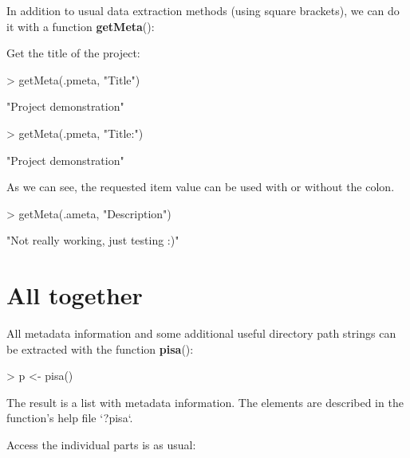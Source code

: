 \documentclass[a4paper,12pt]{article}\usepackage[]{graphicx}\usepackage[]{color}
\makeatletter
\providecommand\code{\bgroup\@codex}
\def\@codex#1{{\normalfont\ttfamily\hyphenchar\font=-1  #1}\egroup}
\providecommand{\fct}[1]{{\ttfamily\textbf{#1}()}}
\makeatother
\begin{document}
In addition to usual data extraction methods (using square brackets), we can do it with a function \fct{getMeta}:

Get the title of the project:

\begin{Schunk}
\begin{Sinput}
> getMeta(.pmeta, "Title")
\end{Sinput}
\begin{Soutput}
[1] "Project demonstration"
\end{Soutput}
\begin{Sinput}
> getMeta(.pmeta, "Title:")
\end{Sinput}
\begin{Soutput}
[1] "Project demonstration"
\end{Soutput}
\end{Schunk}

As we can see, the requested item value can be used with or without the colon.

\begin{Schunk}
\begin{Sinput}
> getMeta(.ameta, "Description")
\end{Sinput}
\begin{Soutput}
[1] "Not really working, just testing :)"
\end{Soutput}
\end{Schunk}

\section{All together}

All metadata information and some additional useful directory path strings can be extracted with the function \fct{pisa}:

\begin{Schunk}
\begin{Sinput}
> p <- pisa()
\end{Sinput}
\end{Schunk}

The result is a list with metadata information. The elements are described in the function's help file \code{`?pisa`}.

Access the individual parts is as usual:

\begin{Schunk}
\end{Schunk}
\end{document}
